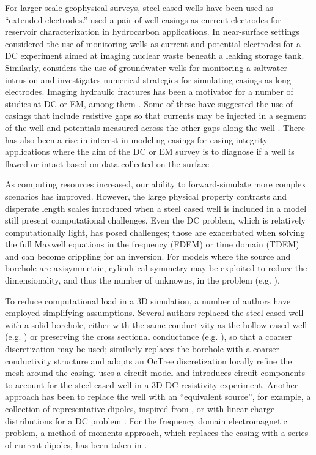 \documentclass[preprint,review,3p,times,onecolumn,authoryear]{elsarticle}
\begin{document}
For larger scale geophysical surveys, steel cased wells have been used as ``extended electrodes.'' \cite{Rocroi1985} used a pair of well casings as current electrodes for reservoir characterization in hydrocarbon applications. In near-surface settings \citep{Ramirez1996, Rucker2010, Rucker2012} considered the use of monitoring wells as current and potential electrodes for a DC experiment aimed at imaging nuclear waste beneath a leaking storage tank. Similarly, \cite{Ronczka2015} considers the use of groundwater wells for monitoring a saltwater intrusion and investigates numerical strategies for simulating casings as long electrodes. Imaging hydraulic fractures has been a motivator for a number of studies at DC or EM, among them \cite{Weiss2016, hoversten2017borehole}. Some of these have suggested the use of casings that include resistive gaps so that currents may be injected in a segment of the well and potentials measured across the other gaps along the well \citep{Nekut1995, Zhang2018}. There has also been a rise in interest in modeling casings for casing integrity applications where the aim of the DC or EM survey is to diagnose if a well is flawed or intact based on data collected on the surface \citep{Wilt2018}.

As computing resources increased, our ability to forward-simulate more complex scenarios has improved. However, the large physical property contrasts and disperate length scales introduced when a steel cased well is included in a model still present computational challenges. Even the DC problem, which is relatively computationally light, has posed challenges; those are exacerbated when solving the full Maxwell equations in the frequency (FDEM) or time domain (TDEM) and can become crippling for an inversion. For models where the source and borehole are axisymmetric, cylindrical symmetry may be exploited to reduce the dimensionality, and thus the number of unknowns, in the problem (e.g. \cite{Pardo2013, Heagy2015}).

To reduce computational load in a 3D simulation, a number of authors have employed simplifying assumptions. Several authors replaced the steel-cased well with a solid borehole, either with the same conductivity as the hollow-cased well (e.g. \cite{Um2015, Puzyrev2017}) or preserving the cross sectional conductance (e.g. \cite{Swidinsky2013, Kohnke2017}), so that a coarser discretization may be used; \cite{Haber2016} similarly replaces the borehole with a coarser conductivity structure and adopts an OcTree discretization locally refine the mesh around the casing. \cite{Yang2016} uses a circuit model and introduces circuit components to account for the steel cased well in a 3D DC resistivity experiment. Another approach has been to replace the well with an ``equivalent source'', for example, a collection of representative dipoles, inspired from \cite{cuevas2014}, or with linear charge distributions for a DC problem \citep{Weiss2016}. For the frequency domain electromagnetic problem, a method of moments approach, which replaces the casing with a series of current dipoles, has been taken in \cite{Kohnke2017}.
\end{document}
